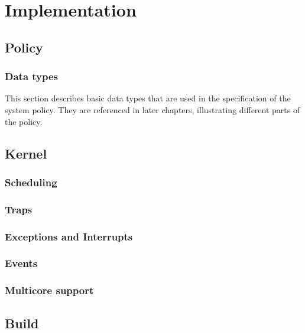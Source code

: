 \chapter{Implementation}

\section{Policy}

\subsection{Data types}
This section describes basic data types that are used in the specification of
the system policy. They are referenced in later chapters, illustrating different
parts of the policy.



\section{Kernel}
\subsection{Scheduling}
\subsection{Traps}
\subsection{Exceptions and Interrupts}
\subsection{Events}
\subsection{Multicore support}
\section{Build}
